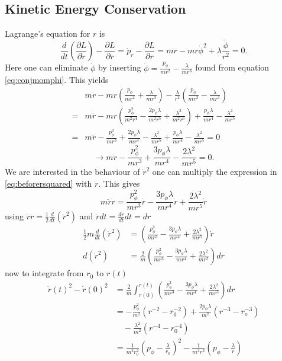 \documentclass[11pt]{amsart}
\begin{document}
\subsection{Kinetic Energy Conservation}
Lagrange's equation for $r$ is
\begin{equation}
\frac{d}{dt}\left(\frac{\partial L}{\partial \dot{r}}\right) - \frac{\partial L}{\partial r} = \dot{p}_r - \frac{\partial L}{\partial r} = m\ddot{r} - mr\dot{\phi}^2 + \lambda\frac{\dot{\phi}}{r^2} = 0.
\end{equation}
Here one can eliminate $\dot{\phi}$ by inserting $\dot{\phi} = \frac{p_\phi}{mr^2} - \frac{\lambda}{mr^3}$ found from equation \ref{eq:conjmomphi}. This yields
\begin{align*}
& m\ddot{r} - mr\left(\frac{p_\phi}{mr^2} + \frac{\lambda}{mr^3} \right) - \frac{\lambda}{r^2}\left(\frac{p_\phi}{mr^2} - \frac{\lambda}{mr^3}\right) \\
=& m\ddot{r} - mr\left(\frac{p_\phi^2}{m^2r^4} - \frac{2p_\phi\lambda}{m^2r^5} + \frac{\lambda^2}{m^2r^6}\right) + \frac{p_\phi\lambda}{mr^4} - \frac{\lambda^2}{mr^5} \\
=& m\ddot{r} - \frac{p_\phi^2}{mr^3} + \frac{2p_\phi\lambda}{mr^4} - \frac{\lambda^2}{mr^5} + \frac{p_\phi\lambda}{mr^4} - \frac{\lambda^2}{mr^5} = 0
\end{align*}
\begin{equation}
\label{eq:beforersquared}
\rightarrow m\ddot{r} - \frac{p_\phi^2}{mr^3} + \frac{3p_\phi\lambda}{mr^4} - \frac{2\lambda^2}{mr^5} = 0.
\end{equation}
We are interested in the behaviour of $\dot{r}^2$ one can multiply the expression in \ref{eq:beforersquared} with $\dot{r}$. This gives
\begin{equation}
m\ddot{r}\dot{r} = \frac{p_\phi^2}{mr^3}\dot{r} - \frac{3p_\phi\lambda}{mr^4}\dot{r} + \frac{2\lambda^2}{mr^5}\dot{r}
\end{equation}
using $\dot{r}\ddot{r} = \frac{1}{2}\frac{d}{dt}(\dot{r}^2)$ and $\dot{r}dt = \frac{dr}{dt}dt = dr$
\begin{align*}
\frac{1}{2}m\frac{d}{dt}(\dot{r}^2) &= \left(\frac{p_\phi^2}{mr^3} - \frac{3p_\phi\lambda}{mr^4} + \frac{2\lambda^2}{mr^5}\right)\dot{r} \\
d(\dot{r}^2) &= \frac{2}{m}\left(\frac{p_\phi^2}{mr^3} - \frac{3p_\phi\lambda}{mr^4} + \frac{2\lambda^2}{mr^5}\right) dr
\end{align*}
now to integrate from $r_0$ to $r(t)$
\begin{align*}
\dot{r}(t)^2 - \dot{r}(0)^2 &= \frac{2}{m}\int_{r(0)}^{r(t)}\left(\frac{p_\phi^2}{mr^3} - \frac{3p_\phi\lambda}{mr^4} + \frac{2\lambda^2}{mr^5} \right)dr \\
&= -\frac{p_\phi^2}{m^2}(r^{-2} - r_0^{-2}) + \frac{2p_\phi\lambda}{m^2}(r^{-3} - r_o^{-3})\\ &\quad -\frac{\lambda^2}{m^2}(r^{-4}-r_0^{-4}) \\
& = \frac{1}{m^2r_0^2}\left(p_\phi-\frac{\lambda}{r_0}\right)^2 - \frac{1}{m^2r^2}\left(p_\phi - \frac{\lambda}{r}\right)
\end{align*}
\end{document}
